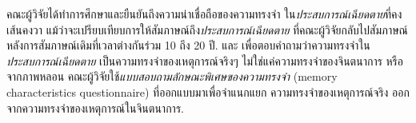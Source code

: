 {\begin{shaded}
		
		
		
		
		
		
		
		
		คณะผู้วิจัยได้ทำการศึกษาและยืนยันถึงความน่าเชื่อถือของความทรงจำ
		ใน\textit{ประสบการณ์เฉียดตาย}ที่คงเส้นคงวา
		แม้ว่าจะเปรียบเทียบการให้สัมภาษณ์ถึง\textit{ประสบการณ์เฉียดตาย}
		ที่คณะผู้วิจัยกลับไปสัมภาษณ์หลังการสัมภาษณ์เดิมที่เวลาต่างกันร่วม 10 ถึง 20 ปี.
		และ
		เพื่อตอบคำถามว่าความทรงจำใน\textit{ประสบการณ์เฉียดตาย} เป็นความทรงจำของเหตุการณ์จริงๆ ไม่ใช่แค่ความทรงจำของจินตนาการ หรือจากภาพหลอน
		คณะผู้วิจัยใช้\textit{แบบสอบถามลักษณะพิเศษของความทรงจำ} (memory characteristics questionnaire\cite{JohnsonEtAl1988a}) ที่ออกแบบมาเพื่อจำแนกแยก ความทรงจำของเหตุการณ์จริง ออกจากความทรงจำของเหตุการณ์ในจินตนาการ.
		
		

\end{shaded}}
